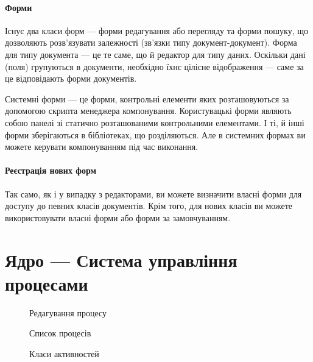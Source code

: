 \documentclass{memoir}
\begin{document}
\paragraph{Форми}

Існує два класи форм — форми редагування або перегляду та форми пошуку, що дозволяють розв’язувати залежності (зв’язки типу документ-документ). Форма для типу документа — це те саме, що й редактор для типу даних. Оскільки дані (поля) групуються в документи, необхідно їхнє цілісне відображення — саме за це відповідають форми документів.

Системні форми — це форми, контрольні елементи яких розташовуються за допомогою скрипта менеджера компонування. Користувацькі форми являють собою панелі зі статично розташованими контрольними елементами. І ті, й інші форми зберігаються в бібліотеках, що розділяються. Але в системних формах ви можете керувати компонуванням під час виконання.

\paragraph{Реєстрація нових форм}

Так само, як і у випадку з редакторами, ви можете визначити власні форми для доступу до певних класів документів. Крім того, для нових класів ви можете використовувати власні форми або форми за замовчуванням.

\section{Ядро — Система управління процесами}

\begin{figure}[h]
    \centering
    \caption{Редагування процесу}
    \label{fig:process_editing}
\end{figure}

\begin{figure}[h]
    \centering
    \caption{Список процесів}
    \label{fig:process_list}
\end{figure}

\begin{figure}[h]
    \centering
    \caption{Класи активностей}
    \label{fig:activity_classes}
\end{figure}
\end{document}
